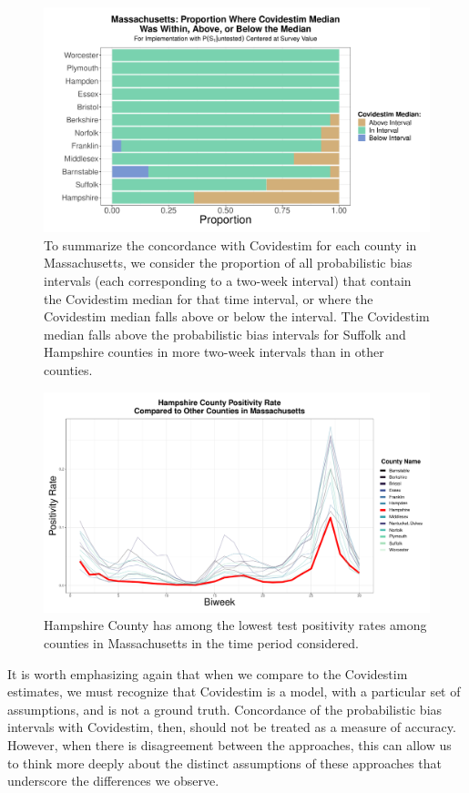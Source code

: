 \documentclass[12pt,twoside]{smiththesis}
\begin{document}
\begin{figure}
\includegraphics[width=1\linewidth]{figure/covidestim_above_below_by_county_ma} \caption{\label{fig:above-below-by-county-ma} To summarize the concordance with Covidestim for each county in Massachusetts, we consider the proportion of all probabilistic bias intervals (each corresponding to a two-week interval) that contain the Covidestim median for that time interval, or where the Covidestim median falls above or below the interval. The Covidestim median falls above the probabilistic bias intervals for Suffolk and Hampshire counties in more two-week intervals than in other counties.}\label{fig:unnamed-chunk-81}
\end{figure}
\begin{figure}
\includegraphics[width=0.9\linewidth]{figure/hampshire} \caption{\label{fig:hamp}Hampshire County has among the lowest test positivity rates among counties in Massachusetts in the time period considered.}\label{fig:unnamed-chunk-82}
\end{figure}
It is worth emphasizing again that when we compare to the Covidestim estimates, we must recognize that Covidestim is a model, with a particular set of assumptions, and is not a ground truth. Concordance of the probabilistic bias intervals with Covidestim, then, should not be treated as a measure of accuracy. However, when there is disagreement between the approaches, this can allow us to think more deeply about the distinct assumptions of these approaches that underscore the differences we observe.
\end{document}
